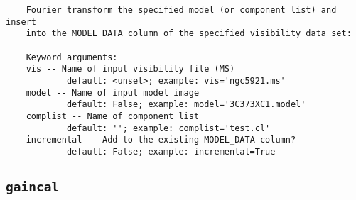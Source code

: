 \small
\begin{verbatim}
    Fourier transform the specified model (or component list) and insert
    into the MODEL_DATA column of the specified visibility data set:  
    
    Keyword arguments:
    vis -- Name of input visibility file (MS)
            default: <unset>; example: vis='ngc5921.ms'
    model -- Name of input model image
            default: False; example: model='3C373XC1.model'
    complist -- Name of component list
            default: ''; example: complist='test.cl'
    incremental -- Add to the existing MODEL_DATA column?
            default: False; example: incremental=True
\end{verbatim}
\normalsize


\subsection{{\tt gaincal}}
\label{section:tasks.gaincal}

